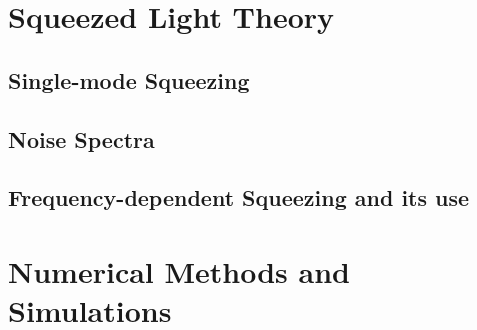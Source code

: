 \section{Squeezed Light Theory}
\subsection{Single-mode Squeezing}
\subsection{Noise Spectra }
\subsection{Frequency-dependent Squeezing and its use}

\section{Numerical Methods and Simulations}
